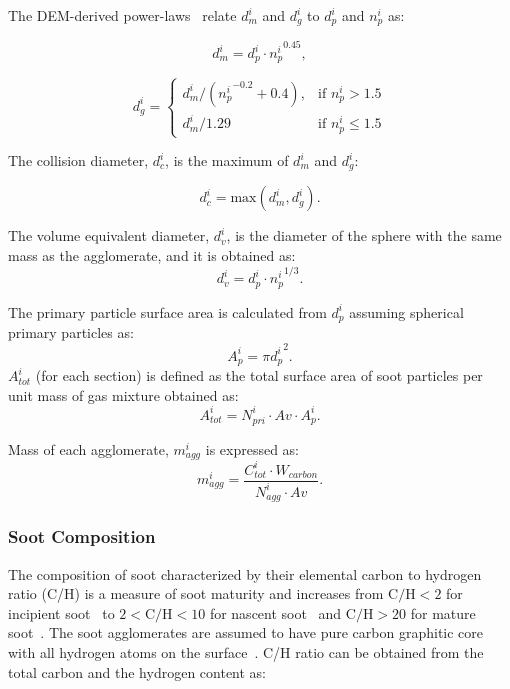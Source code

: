 The DEM-derived power-laws~\citep{Kelesidis2017} relate ${d^i_m}$ and ${d^i_g}$ to ${d^i_p}$ and ${n^i_p}$ as:

\begin{equation}
	d^i_{m} = d^i_p\cdot {n^i_p}^{0.45}
	\label{eqn:d_m},
\end{equation}

\begin{equation}
	d^i_g = 
	\left\{
	\begin{array}{lr}
		d^i_m/({n^i_p}^{-0.2}+0.4), & \text{if } n^i_p > 1.5\\
		d^i_m/1.29 & \text{if } n^i_p\leq 1.5
	\end{array}
	\right.
	\label{eqn:d_g}
\end{equation}

The collision diameter, ${d^i_c}$, is the maximum of ${d^i_{m}}$ and ${d^i_{g}}$:

\begin{equation}
	d^i_c = \mathrm{max}\left(d^i_m, d^i_g\right).
	\label{eqn:d_c}
\end{equation}

The volume equivalent diameter, $d^i_v$, is the diameter of the sphere with the same mass as the agglomerate, and it is obtained as:
\begin{equation}
	d^i_v = d^i_p \cdot {n^i_p}^{1/3}.
	\label{eqn:d_v}
\end{equation}

The primary particle surface area is calculated from ${d^i_p}$ assuming spherical primary particles as:
\begin{equation}
	A^i_{p} = \pi {d^i_p}^2.
	\label{eqn:Ap}
\end{equation}
$A^i_{tot}$ (for each section) is defined as the total surface area of soot particles per unit mass of gas mixture obtained as:
\begin{equation}
	A^i_{tot} = N^i_{pri}\cdot Av\cdot A^i_{p}
	\label{eqn:Atot}.
\end{equation}

Mass of each agglomerate, $m^i_{agg}$ is expressed as:
\begin{equation}
	m^i_{agg} = \frac{C^i_{tot}\cdot W_{carbon}}{N^i_{agg}\cdot Av}.
	\label{eqn:m_agg}
\end{equation}


\subsubsection{Soot Composition}
\label{sec:sootcomp}
The composition of soot characterized by their elemental carbon to hydrogen ratio (C/H) is a measure of soot maturity and increases from $\mathrm{C/H<2}$ for incipient soot~\citep{ciajolo1998spectroscopic} to $\mathrm{2<C/H<10}$ for nascent soot~\citep{betrancourt2017investigation} and $\mathrm{C/H>20}$ for mature soot~\citep{michelsen2017probing}. The soot agglomerates are assumed to have pure carbon graphitic core~\citep{kholghy2016core} with all hydrogen atoms on the surface~\citep{blanquart2009analyzing}. C/H ratio can be obtained from the total carbon and the hydrogen content as:


